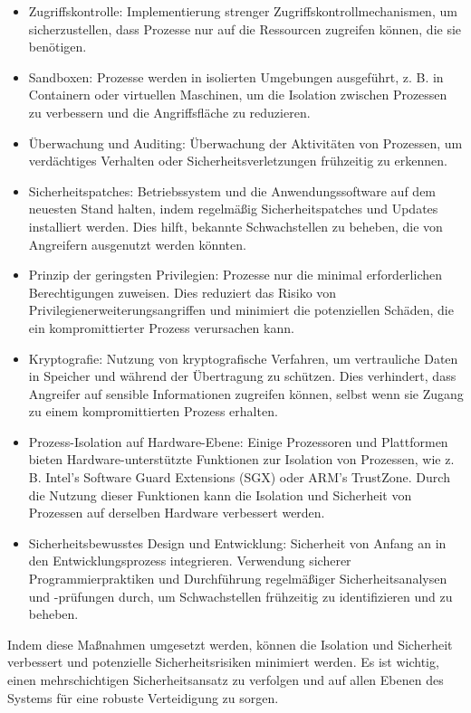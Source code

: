 \documentclass[../vs-script-first-v01.tex]{subfiles}
\begin{document}
\begin{itemize}
\item Zugriffskontrolle: Implementierung strenger Zugriffskontrollmechanismen, um sicherzustellen, dass Prozesse nur auf die Ressourcen zugreifen können, die sie benötigen.
\item Sandboxen: Prozesse werden in isolierten Umgebungen ausgeführt, z. B. in Containern oder virtuellen Maschinen, um die Isolation zwischen Prozessen zu verbessern und die Angriffsfläche zu reduzieren.
\item Überwachung und Auditing: Überwachung der Aktivitäten von Prozessen, um verdächtiges Verhalten oder Sicherheitsverletzungen frühzeitig zu erkennen.
\item Sicherheitspatches: Betriebssystem und die Anwendungssoftware auf dem neuesten Stand halten, indem regelmäßig Sicherheitspatches und Updates installiert werden. Dies hilft, bekannte Schwachstellen zu beheben, die von Angreifern ausgenutzt werden könnten.
\item Prinzip der geringsten Privilegien: Prozesse nur die minimal erforderlichen Berechtigungen zuweisen. Dies reduziert das Risiko von Privilegienerweiterungsangriffen und minimiert die potenziellen Schäden, die ein kompromittierter Prozess verursachen kann.
\item Kryptografie: Nutzung von kryptografische Verfahren, um vertrauliche Daten in Speicher und während der Übertragung zu schützen. Dies verhindert, dass Angreifer auf sensible Informationen zugreifen können, selbst wenn sie Zugang zu einem kompromittierten Prozess erhalten.
\item Prozess-Isolation auf Hardware-Ebene: Einige Prozessoren und Plattformen bieten Hardware-unterstützte Funktionen zur Isolation von Prozessen, wie z. B. Intel's Software Guard Extensions (SGX) oder ARM's TrustZone. Durch die Nutzung dieser Funktionen kann die Isolation und Sicherheit von Prozessen auf derselben Hardware verbessert werden.
\item Sicherheitsbewusstes Design und Entwicklung: Sicherheit von Anfang an in den Entwicklungsprozess integrieren. Verwendung sicherer Programmierpraktiken und Durchführung regelmäßiger Sicherheitsanalysen und -prüfungen durch, um Schwachstellen frühzeitig zu identifizieren und zu beheben.
\end{itemize}
Indem diese Maßnahmen umgesetzt werden, können die Isolation und Sicherheit verbessert und potenzielle Sicherheitsrisiken minimiert werden. Es ist wichtig, einen mehrschichtigen Sicherheitsansatz zu verfolgen und auf allen Ebenen des Systems für eine robuste Verteidigung zu sorgen.
\end{document}
